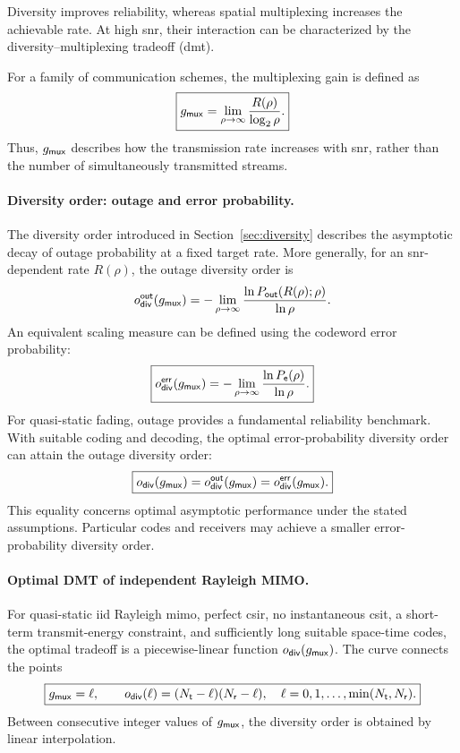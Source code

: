 Diversity improves reliability, whereas spatial multiplexing increases the achievable rate. At high \ac{snr}, their interaction can be characterized by the diversity--multiplexing tradeoff (\ac{dmt}).

For a family of communication schemes, the multiplexing gain is defined as
\begin{equation}\label{eq:multiplexinggain}
	\boxed{
		g_{\mathsf{mux}}
		=\lim_{\rho\to\infty}
		\frac{R(\rho)}{\log_2\rho}.
	}
\end{equation}
Thus, $g_{\mathsf{mux}}$ describes how the transmission rate increases with \ac{snr}, rather than the number of simultaneously transmitted streams.

\paragraph{Diversity order: outage and error probability.}
The diversity order introduced in Section~\ref{sec:diversity} describes the asymptotic decay of outage probability at a fixed target rate. More generally, for an \ac{snr}-dependent rate $R(\rho)$, the outage diversity order is
\begin{equation*}
	o_{\mathsf{div}}^{\mathsf{out}}(g_{\mathsf{mux}})
	=-\lim_{\rho\to\infty}
	\frac{\ln P_{\mathsf{out}}(R(\rho);\rho)}
	{\ln\rho}.
\end{equation*}
An equivalent scaling measure can be defined using the codeword error probability:
\begin{equation}\label{eq:dmtdiversity}
	\boxed{
		o_{\mathsf{div}}^{\mathsf{err}}(g_{\mathsf{mux}})
		=-\lim_{\rho\to\infty}
		\frac{\ln P_{\mathsf e}(\rho)}
		{\ln\rho}.
	}
\end{equation}
For quasi-static fading, outage provides a fundamental reliability benchmark. With suitable coding and decoding, the optimal error-probability diversity order can attain the outage diversity order:
\begin{equation*}
	\boxed{
		o_{\mathsf{div}}(g_{\mathsf{mux}})
		=o_{\mathsf{div}}^{\mathsf{out}}(g_{\mathsf{mux}})
		=o_{\mathsf{div}}^{\mathsf{err}}(g_{\mathsf{mux}}).
	}
\end{equation*}
This equality concerns optimal asymptotic performance under the stated assumptions. Particular codes and receivers may achieve a smaller error-probability diversity order.

\paragraph{Optimal DMT of independent Rayleigh MIMO.}
For quasi-static \ac{iid} Rayleigh \ac{mimo}, perfect \ac{csir}, no instantaneous \ac{csit}, a short-term transmit-energy constraint, and sufficiently long suitable space-time codes, the optimal tradeoff is a piecewise-linear function $o_{\mathsf{div}}(g_{\mathsf{mux}})$. The curve connects the points
\begin{equation}\label{eq:dmt}
	\boxed{
		g_{\mathsf{mux}}=\ell,\qquad
		o_{\mathsf{div}}(\ell)=(N_{\mathsf{t}}-\ell)(N_{\mathsf{r}}-\ell),
		\quad
		\ell=0,1,\ldots,\min(N_{\mathsf{t}},N_{\mathsf{r}}).
	}
\end{equation}
Between consecutive integer values of $g_{\mathsf{mux}}$, the diversity order is obtained by linear interpolation.

